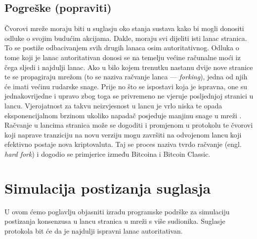 \documentclass[utf8, zavrsni]{fer}
\begin{document}
\section{Pogreške (popraviti)}
Čvorovi mreže moraju biti u suglasju oko stanja sustava kako bi mogli donositi odluke o svojim budućim akcijama. Dakle, moraju svi dijeliti isti lanac stranica. To se postiže odbacivanjem svih drugih lanaca osim autoritativnog. Odluka o tome koji je lanac autoritativan donosi se na temelju većine računalne moći iz čega sljedi i najdulji lanac. Ako u bilo kojem trenutku nastanu dvije nove stranice te se propagiraju mrežom (to se naziva račvanje lanca --- \textit{forking}), jedna od njih će imati većinu rudarske snage. Prije no što se ispostavi koja je ispravna, one su jednakovrijedne i upravo zbog toga se privremeno ne vjeruje posljednjoj stranici u lancu. Vjerojatnost za takvu neizvjesnost u lancu je vrlo niska te opada eksponencijalnom brzinom ukoliko napadač posjeduje manjinu snage u mreži \cite{nakamoto2012bitcoin}. Račvanje u lancima stranica može se dogoditi i promjenom u protokolu te čvorovi koji naprave tranziciju na novu verziju mogu završiti na odvojenom lancu koji efektivno postaje nova kriptovaluta. Taj se proces naziva tvrdo račvanje (engl. \textit{hard fork}) i dogodio se primjerice između Bitcoina i Bitcoin Classic.

\chapter{Simulacija postizanja suglasja}

U ovom ćemo poglavlju objasniti izradu programske podrške za simulaciju postizanja konsenzusa u lancu stranica u mreži s više sudionika. Suglasje protokola bit će da je najdulji ispravni lanac autoritativan.
\end{document}
